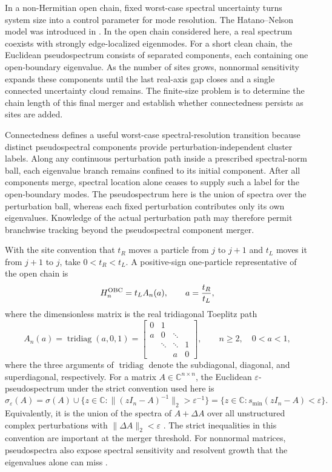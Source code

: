 \documentclass[12pt,anonymous]{iopjournal}
\numberwithin{equation}{section}
\theoremstyle{remark}
\DeclareMathOperator{\tridiag}{tridiag}
\newcommand{\C}{\mathbb C}
\begin{document}
In a non-Hermitian open chain, fixed worst-case spectral uncertainty turns
system size into a control parameter for mode resolution.  The
Hatano--Nelson model was introduced in
\cite{HatanoNelson1996,HatanoNelson1997}.  In the open chain considered
here, a real spectrum coexists with strongly edge-localized eigenmodes.
For a short clean chain, the Euclidean pseudospectrum consists of separated
components, each containing one open-boundary eigenvalue.  As the number of
sites grows, nonnormal sensitivity expands these components until the last
real-axis gap closes and a single connected uncertainty cloud remains.  The
finite-size problem is to determine the chain length of this final merger
and establish whether connectedness persists as sites are added.

Connectedness defines a useful worst-case spectral-resolution transition
because distinct pseudospectral components provide
perturbation-independent cluster labels.  Along any continuous perturbation
path inside a prescribed spectral-norm ball, each eigenvalue branch remains
confined to its initial component.  After all components merge, spectral
location alone ceases to supply such a label for the open-boundary modes.
The pseudospectrum here is the union of spectra over the perturbation ball,
whereas each fixed perturbation contributes only its own eigenvalues.
Knowledge of the actual perturbation path may therefore permit branchwise
tracking beyond the pseudospectral component merger.

With the site convention that \(t_R\) moves a particle from \(j\) to \(j+1\)
and \(t_L\) moves it from \(j+1\) to \(j\), take \(0<t_R<t_L\).  A
positive-sign one-particle representative of the open chain is
\[
 H_n^{\rm OBC}=t_LA_n(a),\qquad a=\frac{t_R}{t_L},
\]
where the dimensionless matrix is the real tridiagonal Toeplitz path
\begin{equation}\label{eq:A-matrix}
 A_n(a)=\tridiag(a,0,1)
 =\begin{bmatrix}
 0&1\\
 a&0&\ddots\\
 &\ddots&\ddots&1\\
 &&a&0
 \end{bmatrix},
 \qquad n\geq2,\quad 0<a<1,
\end{equation}
where the three arguments of $\tridiag$ denote the subdiagonal,
diagonal, and superdiagonal, respectively.  For a matrix
\(A\in\C^{n\times n}\), the Euclidean \(\varepsilon\)-pseudospectrum under
the strict convention used here is
\begin{equation}\label{eq:intro-pseudospectrum}
 \sigma_\varepsilon(A)
 =\sigma(A)\cup
 \{z\in\C:\lVert(zI_n-A)^{-1}\rVert_2>\varepsilon^{-1}\}
 =\{z\in\C:s_{\min}(zI_n-A)<\varepsilon\}.
\end{equation}
Equivalently, it is the union of the spectra of \(A+\Delta A\) over all
unstructured complex perturbations with
\(\lVert\Delta A\rVert_2<\varepsilon\)
\cite{TrefethenEmbree2005}.  The strict inequalities in this convention are
important at the merger threshold.  For nonnormal matrices, pseudospectra
also expose spectral sensitivity and resolvent growth that the eigenvalues
alone can miss \cite{TrefethenEmbree2005,Trefethen1997}.
\end{document}
